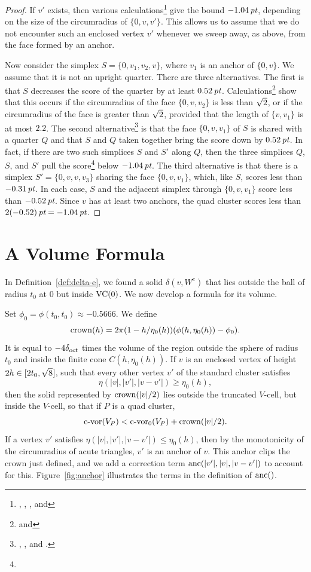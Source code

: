\begin{proof}
If $v'$ exists, then various
calculations\footnote{, ,
, and } give the bound
$-1.04\,\hbox{\it pt}$, depending on the size of the circumradius of
$\{0,v,v'\}$. This allows us to assume that we do not encounter
such an enclosed vertex $v'$ whenever we sweep away, as above,
from the face formed by an anchor.

Now consider the simplex $S=\{0,v_1,v_2,v\}$, where $v_1$ is an
anchor of $\{0,v\}$.  We assume that it is not an upright quarter.
There are three alternatives. The first is that $S$ decreases the
score of the quarter by at least $0.52\,\hbox{\it pt}$.
Calculations\footnote{ and } show
that this occurs if the circumradius of the face $\{0,v,v_2\}$ is
less than $\sqrt2$, or if the circumradius of the face is greater
than $\sqrt2$, provided that the length of $\{v,v_1\}$ is at most
$2.2$. The second alternative\footnote{,
, and .} is that the face
$\{0,v,v_1\}$ of $S$ is shared with a quarter $Q$ and that $S$ and
$Q$ taken together bring the score down by $0.52\,\hbox{\it pt}$. In fact,
if there are two such simplices $S$ and $S'$ along $Q$, then the
three simplices $Q$, $S$, and $S'$ pull the
score\footnote{} below $-1.04\,\hbox{\it pt}$. The third
alternative is that there is a simplex $S'=\{0,v,v,v_3\}$ sharing
the face $\{0,v,v_1\}$, which, like $S$, scores less than
$-0.31\,\hbox{\it pt}$.  In each case, $S$ and the adjacent simplex through
$\{0,v,v_1\}$ score less than $-0.52\,\hbox{\it pt}$. Since $v$ has at least
two anchors, the quad cluster scores less than $2(-0.52)\,\hbox{\it pt}
=-1.04\,\hbox{\it pt}$.
%
\end{proof}

\section{A Volume Formula}

In Definition~\ref{def:delta-e}, we found a solid $\delta(v,W ^e)$
that lies outside the ball of radius $t_0$ at $0$ but inside
${\operatorname{VC}}(0)$.  We now develop a formula for its volume.

Set $\phi_0=\phi(t_0,t_0)\approx -0.5666$. We define
    \begin{equation}\operatorname{crown}(h) =
2\pi(1-h/\eta_0(h))(\phi(h,\eta_0(h))-\phi_0). \end{equation} It
is equal to $-4\delta_{oct}$ times the volume of the region outside the
sphere of radius $t_0$ and inside the finite cone
$C(h,\eta_0(h))$.  If $v$ is an enclosed vertex of height
$2h\in[2t_0,\sqrt8$],
 such that every other vertex $v'$ of the
standard cluster satisfies
$$\eta(|v|,|v'|,|v-v'|)\ge \eta_0(h),$$ then the
solid represented by $\operatorname{crown}(|v|/2)$ lies outside the truncated
$V$-cell, but inside the $V$-cell, so that if $P$ is a quad
cluster,
 $${\operatorname{c-vor}}(V_P) < {\operatorname{c-vor}}_0(V_P) + \operatorname{crown}(|v|/2).$$
If a vertex $v'$ satisfies $\eta(|v|,|v'|,|v-v'|)\le\eta_0(h)$,
then by the monotonicity of the circumradius of acute triangles,
$v'$ is an anchor of $v$.  This anchor clips the crown just
defined, and we add a correction term $\operatorname{anc}(|v'|,|v|,|v-v'|)$ to
account for this. Figure~\ref{fig:anchor} illustrates the terms in
the definition of $\operatorname{anc}()$.

